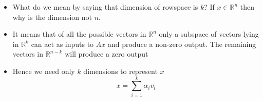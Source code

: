 \begin{frame}
  \begin{overlayarea}{\textwidth}{\textheight}
    \vspace{0.9cm}
    \begin{itemize}\justifying
      \item<1-> What do we mean by saying that dimension of rowspace is $k$? If $x \in \mathbb{R}^n$ then why is the dimension not $n$.
      \item<2-> It means that of all the possible vectors in $\mathbb{R}^n$ only a subspace of vectors lying in $\mathbb{R}^k$ can act as inputs to $Ax$ and produce a non-zero output. The remaining vectors in $\mathbb{R}^{n-k}$ will produce a zero output
      \item<3-> Hence we need only $k$ dimensions to represent $x$
            \begin{equation*}
              x = \sum_{i=1}^{k}\alpha_iv_i
            \end{equation*}
    \end{itemize}
  \end{overlayarea}
\end{frame}

